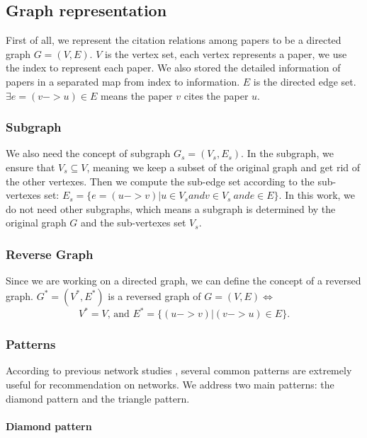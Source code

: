 \subsection{Graph representation}

First of all, we represent the citation relations among papers to be a directed graph $G=(V, E)$. $V$ is the vertex set, each vertex represents a paper, we use the index to represent each paper. We also stored the detailed information of papers in a separated map from index to information. $E$ is the directed edge set. $\exists e=(v -> u) \in E$ means the paper $v$ cites the paper $u$.

\subsubsection{Subgraph}
We also need the concept of subgraph $G_s = (V_s, E_s)$. In the subgraph, we ensure that $V_s \subseteq V$, meaning we keep a subset of the original graph and get rid of the other vertexes. Then we compute the sub-edge set according to the sub-vertexes set: $E_s = \{e=(u -> v) | u \in V_s and v \in V_s\ and e \in E\}$. In this work, we do not need other subgraphs, which means a subgraph is determined by the original graph $G$ and the sub-vertexes set $V_s$.

\subsubsection{Reverse Graph}
Since we are working on a directed graph, we can define the concept of a reversed graph. $G^*=(V^*, E^*)$ is a reversed graph of $G=(V, E)\iff $
\begin{equation}
 V^* = V \text{, and } E^* = \{(u -> v)| (v->u) \in E\}.
\end{equation}

\subsubsection{Patterns}

According to previous network studies \cite{Gupta:2014}, several common patterns are extremely useful for recommendation on networks. We address two main patterns: the diamond pattern and the triangle pattern. 

\paragraph{Diamond pattern}

